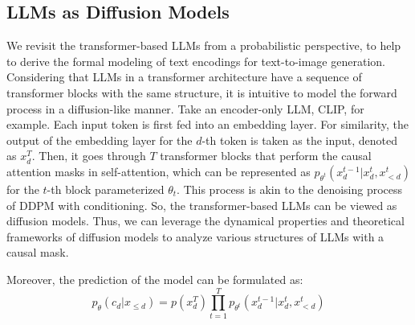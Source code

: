 
\subsection{LLMs as Diffusion Models}

We revisit the transformer-based LLMs from a probabilistic perspective, to help to derive the formal modeling of text encodings for text-to-image generation. 
Considering that LLMs in a transformer architecture have a sequence of transformer blocks with the same structure, it is intuitive to model the forward process in a diffusion-like manner. Take an encoder-only LLM, CLIP, for example. Each input token is first fed into an embedding layer. For similarity, the output of the embedding layer for the $d$-th token is taken as the input, denoted as $x^T_d$. Then, it goes through $T$ transformer blocks that perform the causal attention masks in self-attention, which can be represented as ${p_{\theta^t}}(x^{t-1}_d|x^t_d, x^t_{<d})$ for the $t$-th block parameterized $\theta_t$. 
This process is akin to the denoising process of DDPM with conditioning. So, the transformer-based LLMs can be viewed as diffusion models.  
Thus, we can leverage the dynamical properties and theoretical frameworks of diffusion models to analyze various structures of LLMs with a causal mask.

Moreover, the prediction of the model can be formulated as:
\begin{equation}
\label{equ:llm_diffusion}
p_{\theta}(c_d|x_{\leq d}) = p(x^T_d) \prod_{t=1}^{T}{p_{\theta^t}(x^{t-1}_d|x^t_d, x^t_{<d})}
\end{equation}
% 
   





